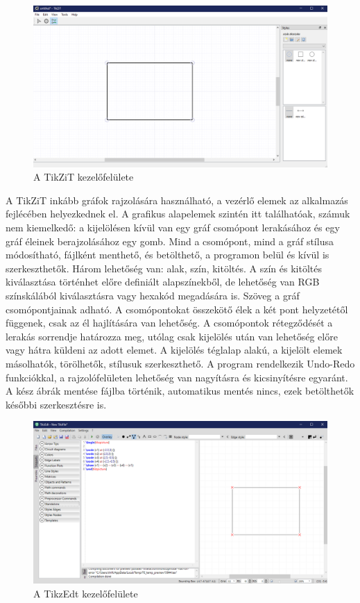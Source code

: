\begin{figure}[!h]
	\includegraphics[width=\textwidth]{images/tikzit.png}
	\caption{A TikZiT kezelőfelülete \cite{tikzit}}
	\label{fig:tikzit}
\end{figure}

\noindent
A TikZiT inkább gráfok rajzolására használható, a vezérlő elemek az alkalmazás fejlécében helyezkednek el. A grafikus alapelemek szintén itt találhatóak, számuk nem kiemelkedő: a kijelölésen kívül van egy gráf csomópont lerakásához és egy gráf éleinek berajzolásához egy gomb. Mind a csomópont, mind a gráf stílusa módosítható, fájlként menthető, és betölthető, a programon belül és kívül is szerkeszthetők. Három lehetőség van: alak, szín, kitöltés. A szín és kitöltés kiválasztása történhet előre definiált alapszínekből, de lehetőség van RGB színskálából kiválasztásra vagy hexakód megadására is. Szöveg a gráf csomópontjainak adható. A csomópontokat összekötő élek a két pont helyzetétől függenek, csak az él hajlítására van lehetőség. A csomópontok rétegződését a lerakás sorrendje határozza meg, utólag csak kijelölés után van lehetőség előre vagy hátra küldeni az adott elemet. A kijelölés téglalap alakú, a kijelölt elemek másolhatók, törölhetők, stílusuk szerkeszthető.  A program rendelkezik Undo-Redo funkciókkal, a rajzolófelületen lehetőség van nagyításra és kicsinyítésre egyaránt. A kész ábrák mentése fájlba történik, automatikus mentés nincs, ezek betölthetők későbbi szerkesztésre is. 

\begin{figure}[!h]
	\includegraphics[width=\textwidth]{images/tikzedt.png}
	\caption{A TikzEdt kezelőfelülete \cite{tikzedt}}
\label{fig:tikzedt}
\end{figure}

